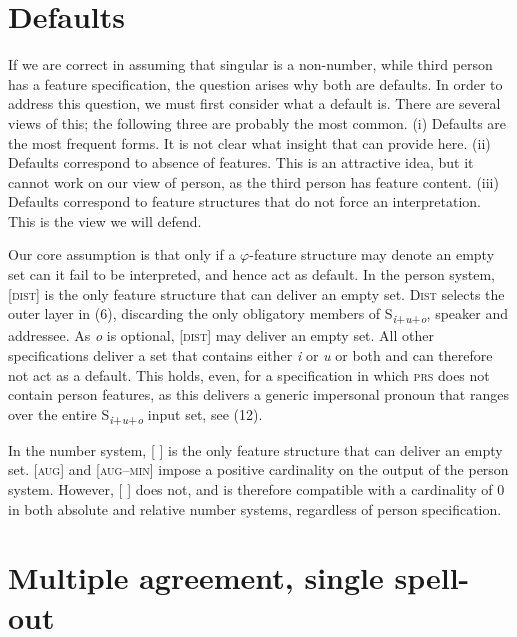 \documentclass[output=paper]{langsci/langscibook}
\begin{document}
\section{Defaults}

If we are correct in assuming that singular is a non-number, while third person has a feature specification, the question arises why both are defaults. In order to address this question, we must first consider what a default is. There are several views of this; the following three are probably the most common. (i) Defaults are the most frequent forms. It is not clear what insight that can provide here. (ii) Defaults correspond to absence of features. This is an attractive idea, but it cannot work on our view of person, as the third person has feature content. (iii) Defaults correspond to feature structures that do not force an interpretation. This is the view we will defend.

  Our core assumption is that only if a $\varphi $-feature structure may denote an empty set can it fail to be interpreted, and hence act as default. In the person system, [\textsc{dist}] is the only feature structure that can deliver an empty set. \textsc{Dist} selects the outer layer in (6), discarding the only obligatory members of S\textit{\textsubscript{i}}\textsubscript{+}\textit{\textsubscript{u}}\textsubscript{+}\textit{\textsubscript{o}}, speaker and addressee. As \textit{o} is optional, [\textsc{dist}] may deliver an empty set. All other specifications deliver a set that contains either \textit{i} or \textit{u} or both and can therefore not act as a default. This holds, even, for a specification in which \textsc{prs} does not contain person features, as this delivers a generic impersonal pronoun that ranges over the entire S\textit{\textsubscript{i}}\textsubscript{+}\textit{\textsubscript{u}}\textsubscript{+}\textit{\textsubscript{o}} input set, see (12).

In the number system, [ ] is the only feature structure that can deliver an empty set. [\textsc{aug}] and [\textsc{aug}–\textsc{min}] impose a positive cardinality on the output of the person system. However, [ ] does not, and is therefore compatible with a cardinality of 0 in both absolute and relative number systems, regardless of person specification. 

\section{Multiple agreement, single spell-out}
\end{document}

